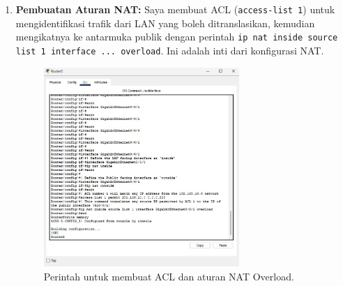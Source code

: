 \begin{enumerate}
    \item \textbf{Pembuatan Aturan NAT:} Saya membuat ACL (\texttt{access-list 1}) untuk mengidentifikasi trafik dari LAN yang boleh ditranslasikan, kemudian mengikatnya ke antarmuka publik dengan perintah \texttt{ip nat inside source list 1 interface ... overload}. Ini adalah inti dari konfigurasi NAT.
    \begin{figure}[H]
        \centering
        \includegraphics[width=0.7\textwidth]{img4/NATrule.jpeg}
        \caption{Perintah untuk membuat ACL dan aturan NAT Overload.}
    \end{figure}
    

\end{enumerate}
